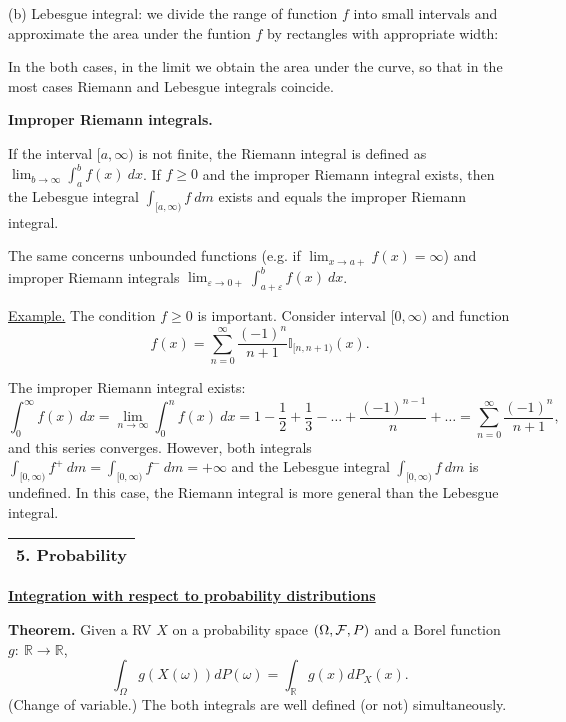\documentclass[a4paper,10pt]{article}
\def\RR{\mathbb{R}}
\def\II{\mathbb{I}}
\newcommand{\1}[1]{\mathbf{1}_{\{#1\}}}
\begin{document}
(b) Lebesgue integral: we divide the range of function $f$ into small intervals and approximate the area under the funtion $f$ by rectangles with appropriate width:
\vspace{5cm}

In the both cases, in the limit we obtain the area under the curve, so that in the most cases Riemann and Lebesgue integrals coincide.\vspace{3mm}

{\bf Improper Riemann integrals.}\vspace{3mm}

If the interval $[a,\infty)$ is not finite, the Riemann integral is defined as $\displaystyle\lim_{b\to\infty} \int_a^b f(x)~dx$. If $f\ge 0$ and the improper Riemann integral exists, then the Lebesgue integral $\displaystyle\int_{[a,\infty)} f~dm$ exists and equals the improper Riemann integral.

The same concerns unbounded functions (e.g. if $\lim_{x\to a+} f(x)=\infty$) and improper Riemann integrals $\displaystyle \lim_{\varepsilon\to 0+} \int_{a+\varepsilon}^b f(x)~dx$.\vspace{3mm}

\underline{Example.} The condition $f\ge 0$ is important. Consider interval $[0,\infty)$ and function
  $$f(x)=\sum_{n=0}^\infty\frac{(-1)^n}{n+1}\II_{[n,n+1)}(x).$$

The improper Riemann integral exists:
  $$\int_0^\infty f(x)~dx=\lim_{n\to\infty}\int_0^n f(x)~dx=1-\frac{1}{2}+\frac{1}{3}-\ldots +\frac{(-1)^{n-1}}{n}+\ldots=\sum_{n=0}^\infty \frac{(-1)^n}{n+1},$$
and this series converges. However, both integrals $\int_{[0,\infty)} f^+~dm=\int_{[0,\infty)} f^-~dm=+\infty$ and  the Lebesgue integral $\int_{[0,\infty)} f~dm$ is undefined. In this case, the Riemann integral is more general than the Lebesgue integral.\vspace{5mm}

\begin{tabular}{|l|}
\hline {\LARGE\bf 5. Probability}\\
\hline\end{tabular}
\vspace{5mm}

\begin{center}\bf\underline{Integration with respect to probability distributions} \end{center}\vspace{3mm}

{\bf Theorem.} Given a RV $X$ on a probability space $(\Omega,{\cal F},P)$ and a Borel function $g:~\RR\to\RR$,
  $$\int_\Omega g(X(\omega))dP(\omega)=\int_\RR g(x) dP_X(x).$$
(Change of variable.) The both integrals are well defined (or not) simultaneously. \vspace{3mm}
\end{document}
